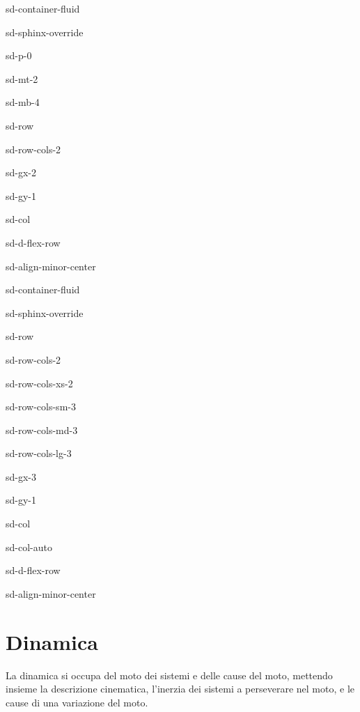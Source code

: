 \documentclass[letterpaper,10pt,italian]{jupyterBook}
\begin{document}
\begin{sphinxuseclass}{sd-container-fluid}
\begin{sphinxuseclass}{sd-sphinx-override}
\begin{sphinxuseclass}{sd-p-0}
\begin{sphinxuseclass}{sd-mt-2}
\begin{sphinxuseclass}{sd-mb-4}
\begin{sphinxuseclass}{sd-row}
\begin{sphinxuseclass}{sd-row-cols-2}
\begin{sphinxuseclass}{sd-gx-2}
\begin{sphinxuseclass}{sd-gy-1}
\begin{sphinxuseclass}{sd-col}
\begin{sphinxuseclass}{sd-d-flex-row}
\begin{sphinxuseclass}{sd-align-minor-center}
\begin{sphinxuseclass}{sd-container-fluid}
\begin{sphinxuseclass}{sd-sphinx-override}
\begin{sphinxuseclass}{sd-row}
\begin{sphinxuseclass}{sd-row-cols-2}
\begin{sphinxuseclass}{sd-row-cols-xs-2}
\begin{sphinxuseclass}{sd-row-cols-sm-3}
\begin{sphinxuseclass}{sd-row-cols-md-3}
\begin{sphinxuseclass}{sd-row-cols-lg-3}
\begin{sphinxuseclass}{sd-gx-3}
\begin{sphinxuseclass}{sd-gy-1}
\begin{sphinxuseclass}{sd-col}
\begin{sphinxuseclass}{sd-col-auto}
\begin{sphinxuseclass}{sd-d-flex-row}
\begin{sphinxuseclass}{sd-align-minor-center}
\end{sphinxuseclass}
\end{sphinxuseclass}
\end{sphinxuseclass}
\end{sphinxuseclass}
\end{sphinxuseclass}
\end{sphinxuseclass}
\end{sphinxuseclass}
\end{sphinxuseclass}
\end{sphinxuseclass}
\end{sphinxuseclass}
\end{sphinxuseclass}
\end{sphinxuseclass}
\end{sphinxuseclass}
\end{sphinxuseclass}
\end{sphinxuseclass}
\end{sphinxuseclass}
\end{sphinxuseclass}
\end{sphinxuseclass}
\end{sphinxuseclass}
\end{sphinxuseclass}
\end{sphinxuseclass}
\end{sphinxuseclass}
\end{sphinxuseclass}
\end{sphinxuseclass}
\end{sphinxuseclass}
\end{sphinxuseclass}

\chapter{Dinamica}
\label{\detokenize{ch/mechanics/dynamics:dinamica}}\label{\detokenize{ch/mechanics/dynamics:physics-hs-mechanics-dynamics}}\label{\detokenize{ch/mechanics/dynamics::doc}}
\sphinxAtStartPar
La dinamica si occupa del moto dei sistemi e delle cause del moto, mettendo insieme la descrizione cinematica, l’inerzia dei sistemi a perseverare nel moto, e le cause di una variazione del moto.
\end{document}

